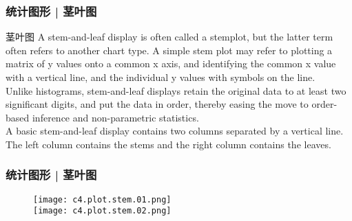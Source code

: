 \begin{frame}
  \frametitle{统计图形 | 茎叶图}
  \begin{block}{茎叶图}
A stem-and-leaf display is often called a stemplot, but the latter term often refers to another chart type. A simple stem plot may refer to plotting a matrix of y values onto a common x axis, and identifying the common x value with a vertical line, and the individual y values with symbols on the line.\\
\vspace{0.5em}
Unlike histograms, stem-and-leaf displays retain the original data to at least two significant digits, and put the data in order, thereby easing the move to order-based inference and non-parametric statistics.\\
\vspace{0.5em}
A basic stem-and-leaf display contains two columns separated by a vertical line. The left column contains the stems and the right column contains the leaves.
  \end{block}
\end{frame}

\begin{frame}
  \frametitle{统计图形 | 茎叶图}
  \begin{figure}
    \centering
    \texttt{[image: c4.plot.stem.01.png]}\\
    \texttt{[image: c4.plot.stem.02.png]}
  \end{figure}
\end{frame}

